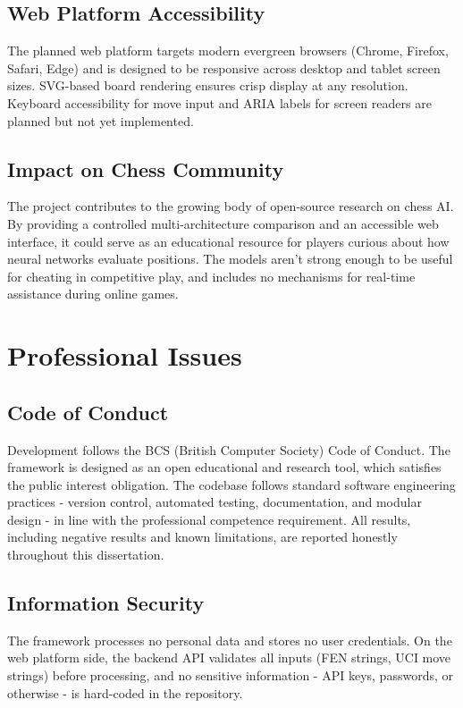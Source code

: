 \subsection{Web Platform Accessibility}

The planned web platform targets modern evergreen browsers (Chrome, Firefox, Safari, Edge) and is designed to be responsive across desktop and tablet screen sizes. SVG-based board rendering ensures crisp display at any resolution. Keyboard accessibility for move input and ARIA labels for screen readers are planned but not yet implemented.

\subsection{Impact on Chess Community}
The project contributes to the growing body of open-source research on chess AI. By providing a controlled multi-architecture comparison and an accessible web interface, it could serve as an educational resource for players curious about how neural networks evaluate positions. The models aren't strong enough to be useful for cheating in competitive play, and includes no mechanisms for real-time assistance during online games.

\section{Professional Issues}

\subsection{Code of Conduct}

Development follows the BCS (British Computer Society) Code of Conduct. The framework is designed as an open educational and research tool, which satisfies the public interest obligation. The codebase follows standard software engineering practices - version control, automated testing, documentation, and modular design - in line with the professional competence requirement. All results, including negative results and known limitations, are reported honestly throughout this dissertation.

\subsection{Information Security}
The framework processes no personal data and stores no user credentials. On the web platform side, the backend API validates all inputs (FEN strings, UCI move strings) before processing, and no sensitive information - API keys, passwords, or otherwise - is hard-coded in the repository.

